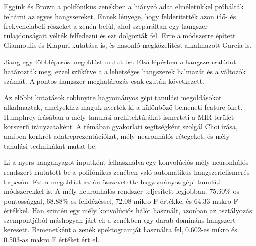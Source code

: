 Eggink és Brown \cite{egginkandbrown2003} a polifónikus zenékben a hiányzó adat elméletükkel próbálták feltárni az egyes hangszereket. Ennek lényege, hogy felderítették azon idő- és frekvenciabeli részeket a zenén belül, ahol szeparáltan egy hangszer tulajdonságait vélték felfedezni és ezt dolgozták fel. Erre a módszerre épített Giannoulis és Klapuri \cite{giannoulisandklapuri2013} kutatása is, és hasonló megközelítést alkalmazott Garcia \cite{garcia2011} is.
 
Jiang \cite{Jiang2013} egy többlépcsős megoldást mutat be. Első lépésben a hangszercsaládot határozták meg, ezzel szűkítve a a lehetséges hangszerek halmazát és a változók számát. A pontos hangszer-meghatározás csak ezután következett.

Az előbbi kutatások többnyire hagyományos gépi tanulási megoldásokat alkalmaztak, amelyekhez maguk nyerték ki a különböző bemeneti feature-öket. Humphrey \cite{humphrey2012} írásában a mély tanulási architektúrákat ismerteti a MIR terület korszerű irányzataként. A témában gyakorlati segítségként szolgál Choi \cite{Choi2017} írása, amiben konkrét adatreprezentációkat, mély neuronhálós rétegeket, és mély tanulási technikákat mutat be.

Li \cite{li2015automatic} a nyers hanganyagot inputként felhasználva egy konvolúciós mély neuronhálós rendszert mutatott be a polifónikus zenében való automatikus hangszerfelismerés kapcsán. Ezt a megoldást aztán összevetette hagyományos gépi tanulási módszerekkel is. A mély neuronhálós rendszer teljesített legjobban. 75.60\%-os pontossággal, 68.88\%-os felidézéssel, 72.08 mikro F értékkel és 64.33 makro F értékkel. Han \cite{han2016deep} szintén egy mély konvolúciós hálót használt, azonban az osztályozás szempontjából máshogyan járt el: a zenékben egy darab domináns hangszert keresett. Bemenetként a zenék spektogramját használta fel, 0.602-es mikro és 0.503-as makro F értéket ért el.
